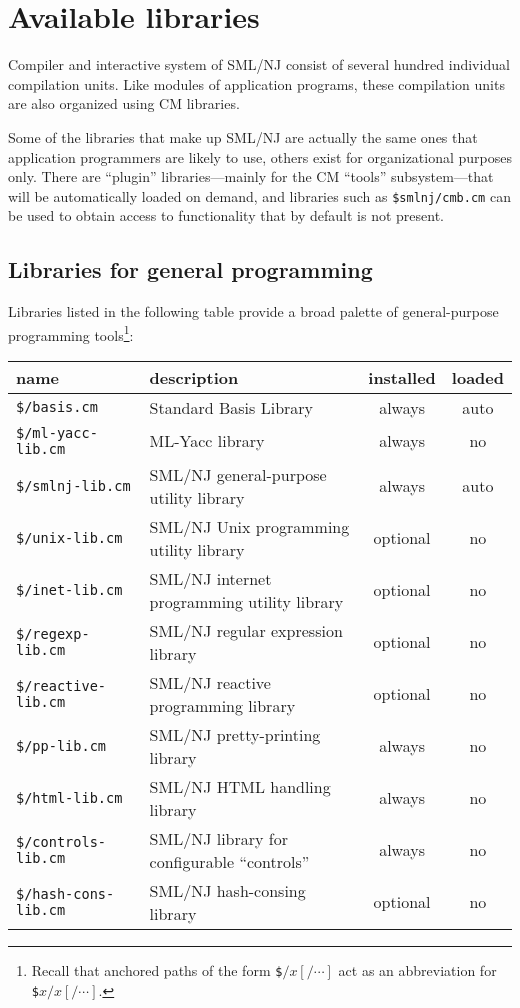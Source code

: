 
\section{Available libraries}

Compiler and interactive system of SML/NJ consist of several hundred
individual compilation units.  Like modules of application programs,
these compilation units are also organized using CM libraries.  

Some of the libraries that make up SML/NJ are actually the same ones
that application programmers are likely to use, others exist for
organizational purposes only.  There are ``plugin'' libraries---mainly
for the CM ``tools'' subsystem---that will be automatically loaded on
demand, and libraries such as {\tt \$smlnj/cmb.cm} can be used to
obtain access to functionality that by default is not present.

\subsection{Libraries for general programming}

Libraries listed in the following table provide a broad palette of
general-purpose programming tools\footnote{Recall that anchored paths
of the form {\tt \$$/x[/\cdots]$} act as an abbreviation for {\tt
\$$x/x[/\cdots]$}.}:

\begin{small}
\begin{center}
\begin{tabular}{p{1.7in}||p{3.4in}|c|c}
name & description & installed & loaded \\
\hline\hline
{\tt \$/basis.cm} & Standard Basis Library & always & auto \\
\hline\hline
{\tt \$/ml-yacc-lib.cm} & ML-Yacc library & always & no \\
\hline\hline
{\tt \$/smlnj-lib.cm} & SML/NJ general-purpose utility library &
always & auto \\
\hline
{\tt \$/unix-lib.cm} & SML/NJ Unix programming utility library &
optional & no \\
\hline
{\tt \$/inet-lib.cm} & SML/NJ internet programming utility library &
optional & no \\
\hline
{\tt \$/regexp-lib.cm} & SML/NJ regular expression library & optional
& no \\
\hline
{\tt \$/reactive-lib.cm} & SML/NJ reactive programming library &
optional & no \\
\hline
{\tt \$/pp-lib.cm} & SML/NJ pretty-printing library & always & no \\
\hline
{\tt \$/html-lib.cm} & SML/NJ HTML handling library & always & no \\
\hline
{\tt \$/controls-lib.cm} & SML/NJ library for configurable
``controls'' & always & no \\
\hline
{\tt \$/hash-cons-lib.cm} & SML/NJ hash-consing library & optional & no
\end{tabular}
\end{center}
\end{small}

